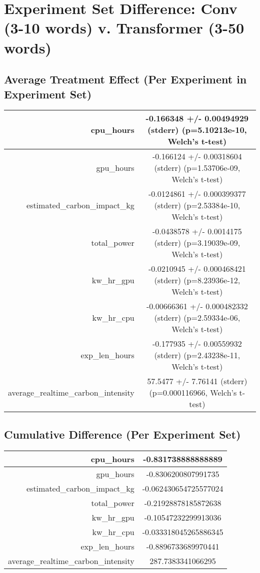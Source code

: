 \documentclass{article}%
\begin{document}
%
\normalsize%
\section{Experiment Set Difference: Conv (3{-}10 words) v. Transformer (3{-}50 words)}%
\label{sec:Experiment Set Difference Conv (3{-}10 words) v. Transformer (3{-}50 words)}%
\subsection{Average Treatment Effect (Per Experiment in Experiment Set)}%
\label{subsec:Average Treatment Effect (Per Experiment in Experiment Set)}%
\begin{tabular}{|r|c|}%
\hline%
cpu\_hours&{-}0.166348 +/{-} 0.00494929 (stderr) (p=5.10213e{-}10, Welch's t{-}test)\\%
\hline%
gpu\_hours&{-}0.166124 +/{-} 0.00318604 (stderr) (p=1.53706e{-}09, Welch's t{-}test)\\%
\hline%
estimated\_carbon\_impact\_kg&{-}0.0124861 +/{-} 0.000399377 (stderr) (p=2.53384e{-}10, Welch's t{-}test)\\%
\hline%
total\_power&{-}0.0438578 +/{-} 0.0014175 (stderr) (p=3.19039e{-}09, Welch's t{-}test)\\%
\hline%
kw\_hr\_gpu&{-}0.0210945 +/{-} 0.000468421 (stderr) (p=8.23936e{-}12, Welch's t{-}test)\\%
\hline%
kw\_hr\_cpu&{-}0.00666361 +/{-} 0.000482332 (stderr) (p=2.59334e{-}06, Welch's t{-}test)\\%
\hline%
exp\_len\_hours&{-}0.177935 +/{-} 0.00559932 (stderr) (p=2.43238e{-}11, Welch's t{-}test)\\%
\hline%
average\_realtime\_carbon\_intensity&57.5477 +/{-} 7.76141 (stderr) (p=0.000116966, Welch's t{-}test)\\%
\hline%
\end{tabular}

%
\subsection{Cumulative Difference (Per Experiment Set)}%
\label{subsec:Cumulative Difference (Per Experiment Set)}%
\begin{tabular}{|r|c|}%
\hline%
cpu\_hours&{-}0.831738888888889\\%
\hline%
gpu\_hours&{-}0.8306200807991735\\%
\hline%
estimated\_carbon\_impact\_kg&{-}0.062430654725577024\\%
\hline%
total\_power&{-}0.21928878185872638\\%
\hline%
kw\_hr\_gpu&{-}0.10547232299913036\\%
\hline%
kw\_hr\_cpu&{-}0.033318045265886345\\%
\hline%
exp\_len\_hours&{-}0.8896733689970441\\%
\hline%
average\_realtime\_carbon\_intensity&287.7383341066295\\%
\hline%
\end{tabular}

%
\end{document}
